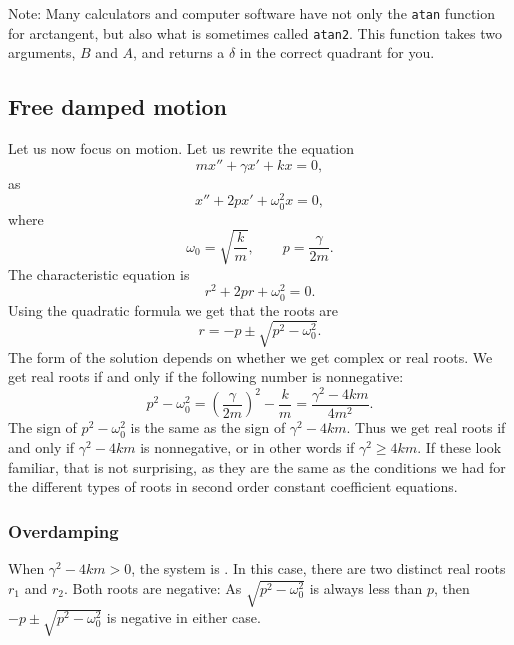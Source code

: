 Note: Many
calculators and computer software have not only the
\texttt{atan} function
for arctangent, but also what is sometimes called \texttt{atan2}.
This function
takes two arguments, $B$ and $A$, and returns a $\delta$ in the
correct quadrant for you.

\subsection{Free damped motion}


Let us now focus on  motion.  Let us rewrite the equation
\begin{equation*}
m x'' + \gamma x' + kx = 0,
\end{equation*}
as
\begin{equation*}
x'' + 2p x' + \omega_0^2 x = 0,
\end{equation*}
where
\begin{equation*}
\omega_0 = \sqrt{\frac{k}{m}}, \qquad p = \frac{\gamma}{2m} .
\end{equation*}
The characteristic equation is
\begin{equation*}
r^2 + 2 pr + \omega_0^2 = 0 .
\end{equation*}
Using the quadratic formula we get that the roots are
\begin{equation*}
r = -p \pm \sqrt{p^2 - \omega_0^2} .
\end{equation*}
The form of the solution depends on whether we get complex or real roots.
We get real roots if and only if the following number is nonnegative:
\begin{equation*}
p^2 - \omega_0^2 = {\left( \frac{\gamma}{2m} \right)}^2 - \frac{k}{m}
= \frac{\gamma^2 - 4km}{4m^2} .
\end{equation*}
The sign of $p^2-\omega_0^2$ is the same as the sign of
$\gamma^2 - 4km$.  Thus we get real roots if and only if $\gamma^2-4km$ is
nonnegative, or in other words if $\gamma^2 \geq 4km$. If these look familiar, that is not surprising, as they are the same as the conditions we had for the different types of roots in second order constant coefficient equations.

\subsubsection{Overdamping}

When
$\gamma^2 - 4km > 0$, the system is \emph{}.  In this case,
there are two distinct real roots $r_1$ and $r_2$.  Both roots are
negative:  As $\sqrt{p^2 - \omega_0^2}$ is always less than $p$,
then
$-p \pm \sqrt{p^2 - \omega_0^2}$ is negative in either case.


